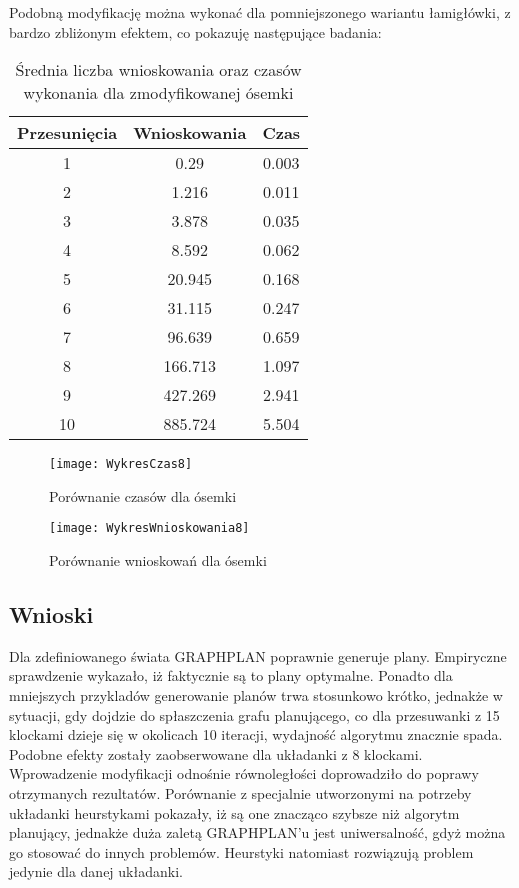         Podobną modyfikację można wykonać dla pomniejszonego wariantu łamigłówki, z bardzo zbliżonym efektem, co pokazuję następujące badania:
        \begin{table}[H]
            \centering
             \begin{tabular}{||c | c | c|} 
             \hline
             Przesunięcia & Wnioskowania & Czas \\ [0.5ex] 
             \hline\hline
             1 & 0.29 & 0.003 \\ 
             \hline
             2 & 1.216 & 0.011 \\
             \hline
             3 & 3.878 & 0.035 \\
             \hline
             4 & 8.592 & 0.062 \\
             \hline
             5 & 20.945 & 0.168 \\
             \hline
             6 & 31.115 & 0.247 \\ 
             \hline
             7 & 96.639 & 0.659 \\
             \hline
             8 & 166.713 & 1.097 \\
             \hline
             9 & 427.269 & 2.941 \\
             \hline
             10 & 885.724 & 5.504 \\ [1ex]
             \hline
             \end{tabular}
             \caption{Średnia liczba wnioskowania oraz czasów wykonania dla zmodyfikowanej ósemki}
        \end{table}

        \begin{figure}[H]
            \texttt{[image: WykresCzas8]}
            \centering
            \caption{Porównanie czasów dla ósemki}
        \end{figure}
        \begin{figure}[H]
            \texttt{[image: WykresWnioskowania8]}
            \centering
            \caption{Porównanie wnioskowań dla ósemki}
        \end{figure}



    \subsection{Wnioski}
        Dla zdefiniowanego świata GRAPHPLAN poprawnie generuje plany. Empiryczne sprawdzenie wykazało, iż faktycznie są to plany optymalne. Ponadto 
        dla mniejszych przykladów generowanie planów trwa stosunkowo krótko, jednakże w sytuacji, gdy dojdzie do spłaszczenia grafu planującego, 
        co dla przesuwanki z 15 klockami dzieje się w okolicach 10 iteracji, wydajność algorytmu znacznie spada. Podobne efekty zostały 
        zaobserwowane dla układanki z 8 klockami. Wprowadzenie modyfikacji odnośnie równoległości doprowadziło do poprawy otrzymanych rezultatów.
        Porównanie z specjalnie utworzonymi na potrzeby układanki heurstykami pokazały, iż są one 
        znacząco szybsze niż algorytm planujący, jednakże duża zaletą GRAPHPLAN'u jest uniwersalność, gdyż można go stosować do innych problemów.
        Heurstyki natomiast rozwiązują problem jedynie dla danej układanki.
